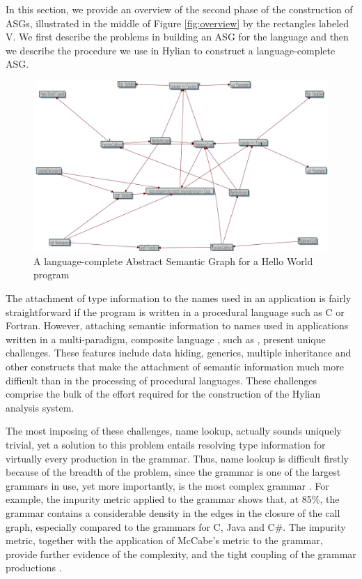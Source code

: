 

In this section, we provide an overview of the second phase of
the construction of ASGs, illustrated in the middle of 
Figure \ref{fig:overview} by the rectangles labeled V.
We first describe the problems in building an ASG for the
{\CPP} language and then we describe the procedure we use
in Hylian to construct a language-complete ASG.


\begin{figure}[htbp]
\centerline{\includegraphics[scale=0.40]{figures/cpphello_full}}
\caption{A language-complete Abstract Semantic Graph for 
a \textsf{Hello World} program}
\label{fig:fullhello}
\figline
\end{figure}


The attachment of type information to the names used in an
application is fairly straightforward if the program is written
in a procedural language such as C or Fortran. However, 
attaching semantic information to names used in applications
written in a multi-paradigm, composite 
language \cite{Stroustrup1994,dennythesis09}, 
such as {\CPP}, present unique challenges.
These features include data hiding, generics, multiple inheritance
and other constructs that make the attachment of semantic information
much more difficult than in the processing of procedural languages. 
These challenges comprise the bulk of the effort required for
the construction of the Hylian analysis system.

The most imposing of these challenges, name lookup, actually sounds 
uniquely trivial, yet a solution to this problem entails resolving
type information for virtually every production in the {\CPP} grammar.
Thus, name lookup is difficult firstly because of the breadth of
the problem, since the {\CPP} grammar is one of the largest grammars
in use, yet more importantly, is the most complex 
grammar \cite{Power-Malloy:04}.
For example, the {\sf impurity} metric applied to the {\CPP}
grammar shows that, at 85\%, the {\CPP} grammar contains a considerable
density in the edges in the closure of the call graph, especially
compared to the grammars for C, Java and C\#.
The {\sf impurity} metric, together with the application of McCabe's
metric to the {\CPP} grammar, provide further evidence of the
complexity, and the tight coupling of the {\CPP} grammar
productions \cite{Power-Malloy:04}.


